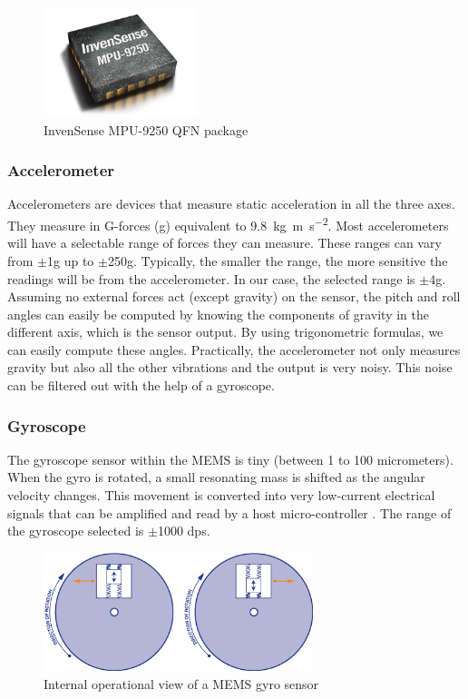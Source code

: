 \documentclass[a4paper,12pt,oneside]{book}
\begin{document}
\begin{figure}[!htb]
\centering
\includegraphics[width=0.4\textwidth]{images/mpu-9250}
\caption{InvenSense MPU-9250 QFN package\cite{mpu9250}}
\end{figure}

\subsubsection{Accelerometer}
Accelerometers are devices that measure static acceleration in all the three axes. They measure in G-forces (g) equivalent to \SI{9.8}{\kilo\gram\meter\per\second\squared}. Most accelerometers will have a selectable range of forces they can measure. These ranges can vary from $\pm$1g up to $\pm$250g. Typically, the smaller the range, the more sensitive the readings will be from the accelerometer. In our case, the selected range is $\pm$4g.\cite{tonik}\\

Assuming no external forces act (except gravity) on the sensor, the pitch and roll angles can easily be computed by knowing the components of gravity in the different axis, which is the sensor output. By using trigonometric formulas, we can easily compute these angles. Practically, the accelerometer not only measures gravity but also all the other vibrations and the output is very noisy. This noise can be filtered out with the help of a gyroscope.\\

\subsubsection{Gyroscope}
The gyroscope sensor within the MEMS is tiny (between 1 to 100 micrometers). When the gyro is rotated, a small resonating mass is shifted as the angular velocity changes. This movement is converted into very low-current electrical signals that can be amplified and read by a host micro-controller \cite{gyro}. The range of the gyroscope selected is $\pm$1000 dps.\\

\begin{figure}[!htb]
\centering
\includegraphics[width=0.7\textwidth]{images/gyro_mems}
\caption{Internal operational view of a MEMS gyro sensor\cite{gyro}}
\end{figure}
\end{document}

